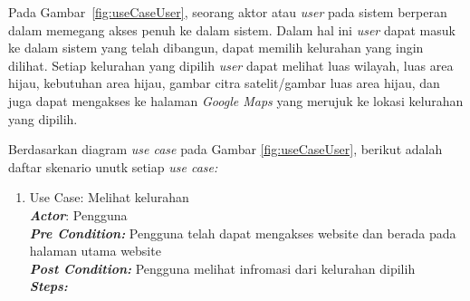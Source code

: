 Pada Gambar~\ref{fig:useCaseUser}, seorang aktor atau \textit{user} pada sistem berperan dalam memegang akses penuh ke dalam sistem. Dalam hal ini \textit{user} dapat masuk ke dalam sistem yang telah dibangun, dapat memilih kelurahan yang ingin dilihat. Setiap kelurahan yang dipilih \textit{user} dapat melihat luas wilayah, luas area hijau, kebutuhan area hijau, gambar citra satelit/gambar luas area hijau, dan juga dapat mengakses ke halaman \textit{Google Maps} yang merujuk ke lokasi kelurahan yang dipilih.
	
Berdasarkan diagram \textit{use case }pada Gambar \ref{fig:useCaseUser}, berikut adalah daftar skenario unutk setiap \textit{use case:}	

\begin{enumerate}
	\item Use Case: Melihat kelurahan \\
	\textit{\textbf{Actor}}: Pengguna \\
	\textit{\textbf{Pre Condition: }}Pengguna telah dapat mengakses website dan berada pada halaman utama website\\
	\textit{\textbf{Post Condition:}} Pengguna melihat infromasi dari kelurahan dipilih\\
	\textit{\textbf{Steps: }}
	\begin{table}[H]
		\centering
	\end{table}
	

\end{enumerate}
